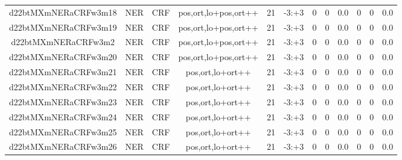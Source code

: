 \documentclass[a4paper]{article}
\begin{document}
\begin{landscape}
\begin{center}
\begin{tabular}{ |c|c|c|c|c|c|c|c|c|c|c|c|}
 
 	
 	\small{ d22btMXmNERaCRFw3m18 } & \small{ NER} & \small{  CRF }  & pos,ort,lo+pos,ort++  &  21 &  \small{  -3:+3 }  &  0 & 0 & 0.0  &  0 & 0 & 0.0 \\
 	

 
 	
 	\small{ d22btMXmNERaCRFw3m19 } & \small{ NER} & \small{  CRF }  & pos,ort,lo+pos,ort++  &  21 &  \small{  -3:+3 }  &  0 & 0 & 0.0  &  0 & 0 & 0.0 \\
 	

 
 	
 	\small{ d22btMXmNERaCRFw3m2 } & \small{ NER} & \small{  CRF }  & pos,ort,lo+pos,ort++  &  21 &  \small{  -3:+3 }  &  0 & 0 & 0.0  &  0 & 0 & 0.0 \\
 	

 
 	
 	\small{ d22btMXmNERaCRFw3m20 } & \small{ NER} & \small{  CRF }  & pos,ort,lo+pos,ort++  &  21 &  \small{  -3:+3 }  &  0 & 0 & 0.0  &  0 & 0 & 0.0 \\
 	

 
 	
 	\small{ d22btMXmNERaCRFw3m21 } & \small{ NER} & \small{  CRF }  & pos,ort,lo+ort++  &  21 &  \small{  -3:+3 }  &  0 & 0 & 0.0  &  0 & 0 & 0.0 \\
 	

 
 	
 	\small{ d22btMXmNERaCRFw3m22 } & \small{ NER} & \small{  CRF }  & pos,ort,lo+ort++  &  21 &  \small{  -3:+3 }  &  0 & 0 & 0.0  &  0 & 0 & 0.0 \\
 	

 
 	
 	\small{ d22btMXmNERaCRFw3m23 } & \small{ NER} & \small{  CRF }  & pos,ort,lo+ort++  &  21 &  \small{  -3:+3 }  &  0 & 0 & 0.0  &  0 & 0 & 0.0 \\
 	

 
 	
 	\small{ d22btMXmNERaCRFw3m24 } & \small{ NER} & \small{  CRF }  & pos,ort,lo+ort++  &  21 &  \small{  -3:+3 }  &  0 & 0 & 0.0  &  0 & 0 & 0.0 \\
 	

 
 	
 	\small{ d22btMXmNERaCRFw3m25 } & \small{ NER} & \small{  CRF }  & pos,ort,lo+ort++  &  21 &  \small{  -3:+3 }  &  0 & 0 & 0.0  &  0 & 0 & 0.0 \\
 	

 
 	
 	\small{ d22btMXmNERaCRFw3m26 } & \small{ NER} & \small{  CRF }  & pos,ort,lo+ort++  &  21 &  \small{  -3:+3 }  &  0 & 0 & 0.0  &  0 & 0 & 0.0 \\
 	


\end{tabular}
\end{center}
\end{landscape}
\end{document}

